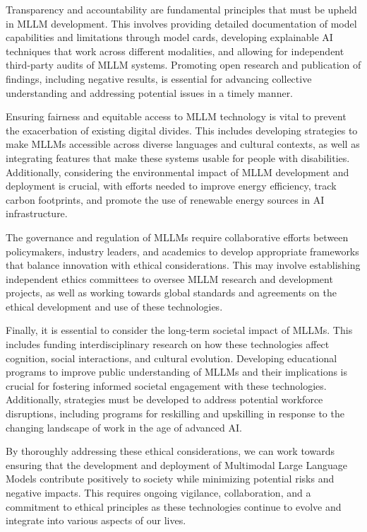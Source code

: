 Transparency and accountability are fundamental principles that must be upheld in MLLM development. This involves providing detailed documentation of model capabilities and limitations through model cards, developing explainable AI techniques that work across different modalities, and allowing for independent third-party audits of MLLM systems. Promoting open research and publication of findings, including negative results, is essential for advancing collective understanding and addressing potential issues in a timely manner.

Ensuring fairness and equitable access to MLLM technology is vital to prevent the exacerbation of existing digital divides. This includes developing strategies to make MLLMs accessible across diverse languages and cultural contexts, as well as integrating features that make these systems usable for people with disabilities. Additionally, considering the environmental impact of MLLM development and deployment is crucial, with efforts needed to improve energy efficiency, track carbon footprints, and promote the use of renewable energy sources in AI infrastructure.

The governance and regulation of MLLMs require collaborative efforts between policymakers, industry leaders, and academics to develop appropriate frameworks that balance innovation with ethical considerations. This may involve establishing independent ethics committees to oversee MLLM research and development projects, as well as working towards global standards and agreements on the ethical development and use of these technologies.

Finally, it is essential to consider the long-term societal impact of MLLMs. This includes funding interdisciplinary research on how these technologies affect cognition, social interactions, and cultural evolution. Developing educational programs to improve public understanding of MLLMs and their implications is crucial for fostering informed societal engagement with these technologies. Additionally, strategies must be developed to address potential workforce disruptions, including programs for reskilling and upskilling in response to the changing landscape of work in the age of advanced AI.

By thoroughly addressing these ethical considerations, we can work towards ensuring that the development and deployment of Multimodal Large Language Models contribute positively to society while minimizing potential risks and negative impacts. This requires ongoing vigilance, collaboration, and a commitment to ethical principles as these technologies continue to evolve and integrate into various aspects of our lives.

